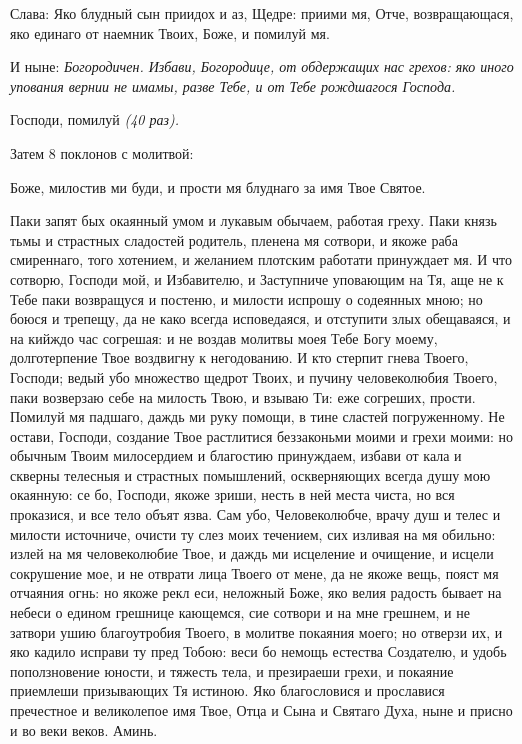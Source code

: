 Слава: Яко блудный сын приидох и аз, Щедре: приими мя, Отче, возвращающася, яко единаго от наемник Твоих, Боже, и помилуй мя.


И ныне: \itshape Богородичен\normalfont{}. Избави, Богородице, от обдержащих нас грехов: яко иного упования вернии не имамы, разве Тебе, и от Тебе рождшагося Господа.


Господи, помилуй \itshape (40 раз).\normalfont{}


Затем 8 поклонов с молитвой: 

Боже, милостив ми буди, и прости мя блуднаго за имя Твое Святое.



Паки запят бых окаянный умом и лукавым обычаем, работая греху. Паки князь тьмы и страстных сладостей родитель, пленена мя сотвори, и якоже раба смиреннаго, того хотением, и желанием плотским работати принуждает мя. И что сотворю, Господи мой, и Избавителю, и Заступниче уповающим на Тя, аще не к Тебе паки возвращуся и постеню, и милости испрошу о содеянных мною; но боюся и трепещу, да не како всегда исповедаяся, и отступити злых обещаваяся, и на кийждо час согрешая: и не воздав молитвы моея Тебе Богу моему, долготерпение Твое воздвигну к негодованию. И кто стерпит гнева Твоего, Господи; ведый убо множество щедрот Твоих, и пучину человеколюбия Твоего, паки возверзаю себе на милость Твою, и взываю Ти: еже согреших, прости. Помилуй мя падшаго, даждь ми руку помощи, в тине сластей погруженному. Не остави, Господи, создание Твое растлитися беззаконьми моими и грехи моими: но обычным Твоим милосердием и благостию принуждаем, избави от кала и скверны телесныя и страстных помышлений, оскверняющих всегда душу мою окаянную: се бо, Господи, якоже зриши, несть в ней места чиста, но вся проказися, и все тело объят язва. Сам убо, Человеколюбче, врачу душ и телес и милости источниче, очисти ту слез моих течением, сих изливая на мя обильно: излей на мя человеколюбие Твое, и даждь ми исцеление и очищение, и исцели сокрушение мое, и не отврати лица Твоего от мене, да не якоже вещь, пояст мя отчаяния огнь: но якоже рекл еси, неложный Боже, яко велия радость бывает на небеси о едином грешнице кающемся, сие сотвори и на мне грешнем, и не затвори ушию благоутробия Твоего, в молитве покаяния моего; но отверзи их, и яко кадило исправи ту пред Тобою: веси бо немощь естества Создателю, и удобь поползновение юности, и тяжесть тела, и презираеши грехи, и покаяние приемлеши призывающих Тя истиною. Яко благословися и прославися пречестное и великолепое имя Твое, Отца и Сына и Святаго Духа, ныне и присно и во веки веков. Аминь.


